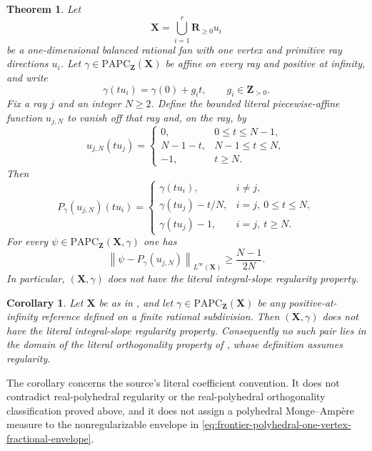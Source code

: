 \documentclass[11pt,a4paper]{article}
\newtheorem{theorem}{Theorem}[section]
\newtheorem{corollary}[corollary]{Corollary}
\theoremstyle{definition}
\theoremstyle{remark}
\begin{document}
\begin{theorem}
\label{thm:frontier-polyhedral-one-vertex-integral-nonregularity}
Let
\[
                  \mathbf X=\bigcup_{i=1}^r\mathbf R_{\geq0}u_i
\]
be a one-dimensional balanced rational fan with one vertex and primitive ray
directions $u_i$.  Let
$\gamma\in\mathrm{PAPC}_{\mathbf Z}(\mathbf X)$ be affine on every ray and
positive at infinity, and write
\[
                   \gamma(tu_i)=\gamma(0)+g_i t,
                   \qquad g_i\in\mathbf Z_{>0}.
\]
Fix a ray $j$ and an integer $N\geq2$.  Define the bounded literal
piecewise-affine function $u_{j,N}$ to vanish off that ray and, on the ray,
by
\[
 u_{j,N}(tu_j)=
 \begin{cases}
  0,&0\leq t\leq N-1,\\
  N-1-t,&N-1\leq t\leq N,\\
  -1,&t\geq N.
 \end{cases}
\]
Then
\begin{equation}
\label{eq:frontier-polyhedral-one-vertex-fractional-envelope}
 P_\gamma(u_{j,N})(tu_i)=
 \begin{cases}
  \gamma(tu_i),&i\neq j,\\
  \gamma(tu_j)-t/N,&i=j,\ 0\leq t\leq N,\\
  \gamma(tu_j)-1,&i=j,\ t\geq N.
 \end{cases}
\end{equation}
For every
$\psi\in\mathrm{PAPC}_{\mathbf Z}(\mathbf X,\gamma)$ one has
\[
 \left\lVert\psi-P_\gamma(u_{j,N})\right\rVert_{L^\infty(\mathbf X)}
 \geq\frac{N-1}{2N}.
\]
In particular, $(\mathbf X,\gamma)$ does not have the literal
integral-slope regularity property.
\end{theorem}

\begin{corollary}
\label{cor:frontier-polyhedral-one-vertex-integral-nonregularity}
Let $\mathbf X$ be as in
, and let
$\gamma\in\mathrm{PAPC}_{\mathbf Z}(\mathbf X)$ be any positive-at-infinity
reference defined on a finite rational subdivision.  Then
$(\mathbf X,\gamma)$ does not have the literal integral-slope regularity
property.  Consequently no such pair lies in the domain of the literal
orthogonality property of \cite[Definition~6.9]{BMPS26}, whose definition
assumes regularity.
\end{corollary}

The corollary concerns the source's literal coefficient convention.  It does
not contradict real-polyhedral regularity or the real-polyhedral
orthogonality classification proved above, and it does not assign a
polyhedral Monge--Amp\`ere measure to the nonregularizable envelope in
\eqref{eq:frontier-polyhedral-one-vertex-fractional-envelope}.
\end{document}
